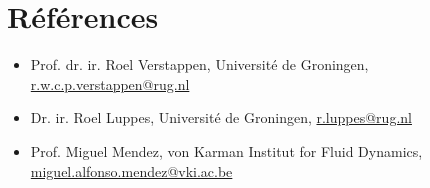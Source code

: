 \section*{Références}
\begin{itemize}
    \item Prof. dr. ir. Roel Verstappen, Université de Groningen, \href{mailto:r.w.c.p.verstappen@rug.nl}{r.w.c.p.verstappen@rug.nl}
    \item Dr. ir. Roel Luppes, Université de Groningen, \href{mailto:r.luppes@rug.nl}{r.luppes@rug.nl}
    \item Prof. Miguel Mendez, von Karman Institut for Fluid Dynamics, 
    \href{mailto:miguel.alfonso.mendez@vki.ac.be}{miguel.alfonso.mendez@vki.ac.be}
\end{itemize}